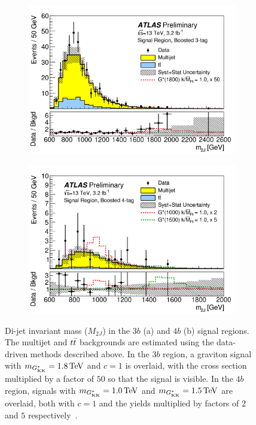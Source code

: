 \begin{figure}[h!]
  \centering
  \captionsetup{justification=centering}

   \begin{subfigure}[t]{0.5\textwidth}
        \centering
        \includegraphics[width=\textwidth]{figures/3b_signal}
        \caption{}
    \end{subfigure}%
    \begin{subfigure}[t]{0.5\textwidth}
        \centering
        \includegraphics[width=\textwidth]{figures/4b_signal}
        \caption{}
    \end{subfigure}

   \caption{Di-jet invariant mass ($M_{2J}$) in the $3b$ (a) and $4b$ (b) signal regions. The multijet and $t\bar{t}$ backgrounds are estimated using the data-driven methods described above. In the $3b$ region, a graviton signal with $m_{\Gkk} = 1.8 \TeV$ and $c=1$ is overlaid, with the cross section multiplied by a factor of $50$ so that the signal is visible. In the $4b$ region, signals with $m_{\Gkk} = 1.0 \TeV$ and $m_{\Gkk} = 1.5 \TeV$ are overlaid, both with $c = 1$ and the yields multiplied by factors of $2$ and $5$ respectively~\cite{4bconf}.}
  \label{fig:BoostedResults}
\end{figure}


